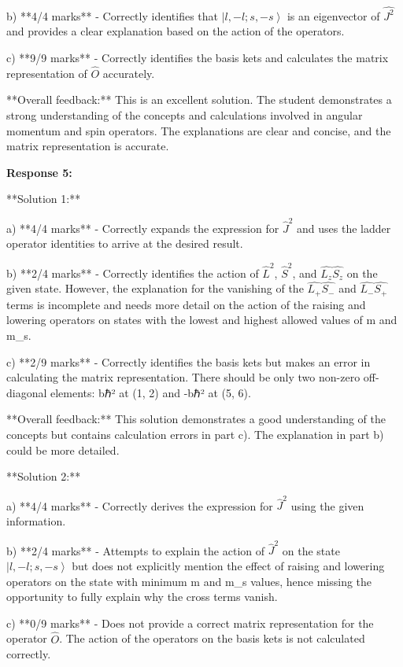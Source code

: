 \documentclass[a4paper,11pt]{article}
\begin{document}
b) **4/4 marks** - Correctly identifies that \( \left|l, -l; s, -s \right> \) is an eigenvector of \( \hat{J^2} \) and provides a clear explanation based on the action of the operators.

c) **9/9 marks** - Correctly identifies the basis kets and calculates the matrix representation of \( \hat{O} \) accurately.

**Overall feedback:** This is an excellent solution. The student demonstrates a strong understanding of the concepts and calculations involved in angular momentum and spin operators. The explanations are clear and concise, and the matrix representation is accurate.


\textbf{Response 5:}

**Solution 1:**

a) **4/4 marks** - Correctly expands the expression for  \(\hat{J}^2\) and uses the ladder operator identities to arrive at the desired result.

b) **2/4 marks** - Correctly identifies the action of \(\hat{L}^2\), \(\hat{S}^2\), and \(\hat{L_z}\hat{S_z}\) on the given state. However, the explanation for the vanishing of the \(\hat{L_+}\hat{S_-}\) and \(\hat{L_-}\hat{S_+}\) terms is incomplete and needs more detail on the action of the raising and lowering operators on states with the lowest and highest allowed values of m and m_s.

c) **2/9 marks** - Correctly identifies the basis kets but makes an error in calculating the matrix representation. There should be only two non-zero off-diagonal elements: bℏ² at (1, 2) and -bℏ² at (5, 6).

**Overall feedback:** This solution demonstrates a good understanding of the concepts but contains calculation errors in part c). The explanation in part b) could be more detailed.

**Solution 2:**

a) **4/4 marks** - Correctly derives the expression for \(\hat{J}^2\) using the given information.

b) **2/4 marks** - Attempts to explain the action of \(\hat{J}^2\) on the state \(\left|l, -l; s, -s \right>\) but does not explicitly mention the effect of raising and lowering operators on the state with minimum m and m_s values, hence missing the opportunity to fully explain why the cross terms vanish.

c) **0/9 marks** - Does not provide a correct matrix representation for the operator \(\hat{O}\). The action of the operators on the basis kets is not calculated correctly.
\end{document}
